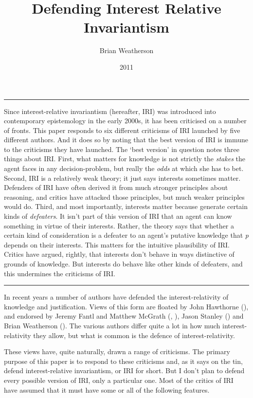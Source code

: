 \documentclass[
  10pt,
  letterpaper,
  DIV=11,
  numbers=noendperiod,
  twoside]{scrartcl}
\title{Defending Interest Relative Invariantism}
\author{Brian Weatherson}
\date{2011}
\renewenvironment{abstract}
 {\vspace{-1.25cm}
 \quotation\small\noindent\rule{\linewidth}{.5pt}\par\smallskip
 \noindent }
 {\par\noindent\rule{\linewidth}{.5pt}\endquotation}
\begin{document}
\maketitle
\begin{abstract}
Since interest-relative invariantism (hereafter, IRI) was introduced
into contemporary epistemology in the early 2000s, it has been
criticised on a number of fronts. This paper responds to six different
criticisms of IRI launched by five different authors. And it does so by
noting that the best version of IRI is immune to the criticisms they
have launched. The `best version' in question notes three things about
IRI. First, what matters for knowledge is not strictly the \emph{stakes}
the agent faces in any decision-problem, but really the \emph{odds} at
which she has to bet. Second, IRI is a relatively weak theory; it just
says interests sometimes matter. Defenders of IRI have often derived it
from much stronger principles about reasoning, and critics have attacked
those principles, but much weaker principles would do. Third, and most
importantly, interests matter because generate certain kinds of
\emph{defeaters}. It isn't part of this version of IRI that an agent can
know something in virtue of their interests. Rather, the theory says
that whether a certain kind of consideration is a defeater to an agent's
putative knowledge that \emph{p} depends on their interests. This
matters for the intuitive plausibility of IRI. Critics have argued,
rightly, that interests don't behave in ways distinctive of grounds of
knowledge. But interests do behave like other kinds of defeaters, and
this undermines the criticisms of IRI.
\end{abstract}

In recent years a number of authors have defended the
interest-relativity of knowledge and justification. Views of this form
are floated by John Hawthorne (), and
endorsed by Jeremy Fantl and Matthew McGrath
(, ),
Jason Stanley () and Brian
Weatherson (). The various
authors differ quite a lot in how much interest-relativity they allow,
but what is common is the defence of interest-relativity.

These views have, quite naturally, drawn a range of criticisms. The
primary purpose of this paper is to respond to these criticisms and, as
it says on the tin, defend interest-relative invariantism, or IRI for
short. But I don't plan to defend every possible version of IRI, only a
particular one. Most of the critics of IRI have assumed that it must
have some or all of the following features.
\end{document}
